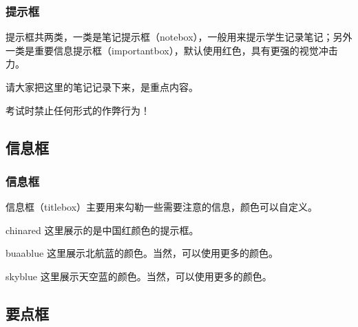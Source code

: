 \documentclass[aspectratio=169,UTF8,t]{beamer}%
\begin{document}
\begin{frame}
    \frametitle{提示框}
    提示框共两类，一类是笔记提示框（notebox），一般用来提示学生记录笔记；另外一类是重要信息提示框（importantbox），默认使用红色，具有更强的视觉冲击力。
      \begin{notebox}[笔记]
        请大家把这里的笔记记录下来，是重点内容。 
      \end{notebox}
      \begin{importantbox}[重要]
        考试时禁止任何形式的作弊行为！
      \end{importantbox}              
\end{frame}

\subsection{信息框}

\begin{frame}
    \frametitle{信息框}
    信息框（titlebox）主要用来勾勒一些需要注意的信息，颜色可以自定义。
    \begin{titlebox}[提示框]{chinared}
        这里展示的是中国红颜色的提示框。
      \end{titlebox}
      \begin{titlebox}[颜色展示]{buaablue}
        这里展示北航蓝的颜色。当然，可以使用更多的颜色。 
      \end{titlebox}
      \begin{titlebox}[另外一些颜色的显示]{skyblue}
        这里展示天空蓝的颜色。当然，可以使用更多的颜色。 
      \end{titlebox}    
\end{frame}

\subsection{要点框}
\end{document}
